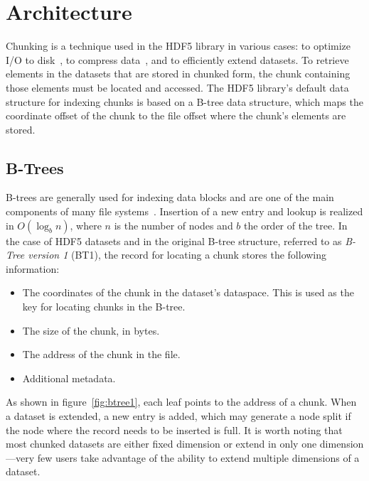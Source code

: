 \section{Architecture}
\label{sec:architecture}

\begin{figure*}
\centering

\caption{Simplified version of original B-tree structure used for indexing 
chunks. In the case of extendable datasets, whenever a new chunk is added to 
the B-tree, its right-most node, if full, is split and a new half empty node 
is created.}
\label{fig:btree1}
\end{figure*}

Chunking is a technique used in the HDF5 library in various cases:
to optimize I/O to disk~\cite{Howison2010}, to compress data~\cite{Folk2011},
and to efficiently extend datasets.
To retrieve elements in the datasets that are stored in chunked form, the
chunk containing those elements must be located and accessed.
The HDF5 library's default data structure for indexing chunks is based on
a B-tree data structure, which maps the coordinate offset of the chunk to the
file offset where the chunk's elements are stored.

\subsection{B-Trees}

B-trees are generally used for indexing data blocks
and are one of the main components of many file systems~\cite{Comer1979}\cite{Folk1992}. 
Insertion of a new entry and lookup is realized in $O(\log_b{n})$, where $n$ is the
number of nodes and $b$ the order of the tree.
In the case of HDF5 datasets and in the original B-tree structure, referred to
as \textit{B-Tree version 1} (BT1), the record for locating a chunk stores the
following information:
\begin{itemize}
\item The coordinates of the chunk in the dataset's dataspace. This is used
as the key for locating chunks in the B-tree.
\item The size of the chunk, in bytes.
\item The address of the chunk in the file.
\item Additional metadata.
\end{itemize}

As shown in figure~\ref{fig:btree1}, each leaf points to the address of a
chunk. When a dataset is extended, a new entry is added, which may
generate a node split if the node where the record needs to be inserted is full. 
It is worth noting that most chunked datasets are either fixed dimension or
extend in only one dimension---very few users take advantage of the ability to 
extend multiple dimensions of a dataset.


